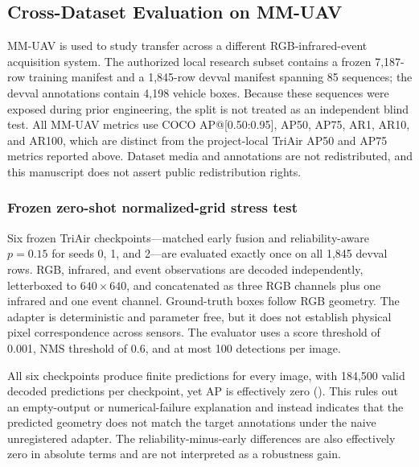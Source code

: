 \subsection{Cross-Dataset Evaluation on MM-UAV}
\label{sec:mmuav}
MM-UAV \cite{xu2025mmuav} is used to study transfer across a different RGB-infrared-event acquisition system. The authorized local research subset contains a frozen 7,187-row training manifest and a 1,845-row devval manifest spanning 85 sequences; the devval annotations contain 4,198 vehicle boxes. Because these sequences were exposed during prior engineering, the split is not treated as an independent blind test. All MM-UAV metrics use COCO AP@[0.50:0.95], AP50, AP75, AR1, AR10, and AR100, which are distinct from the project-local TriAir AP50 and AP75 metrics reported above. Dataset media and annotations are not redistributed, and this manuscript does not assert public redistribution rights.

\subsubsection{Frozen zero-shot normalized-grid stress test}
Six frozen TriAir checkpoints---matched early fusion and reliability-aware $p=0.15$ for seeds 0, 1, and 2---are evaluated exactly once on all 1,845 devval rows. RGB, infrared, and event observations are decoded independently, letterboxed to $640\times640$, and concatenated as three RGB channels plus one infrared and one event channel. Ground-truth boxes follow RGB geometry. The adapter is deterministic and parameter free, but it does not establish physical pixel correspondence across sensors. The evaluator uses a score threshold of 0.001, NMS threshold of 0.6, and at most 100 detections per image.

All six checkpoints produce finite predictions for every image, with 184,500 valid decoded predictions per checkpoint, yet AP is effectively zero (). This rules out an empty-output or numerical-failure explanation and instead indicates that the predicted geometry does not match the target annotations under the naive unregistered adapter. The reliability-minus-early differences are also effectively zero in absolute terms and are not interpreted as a robustness gain.

